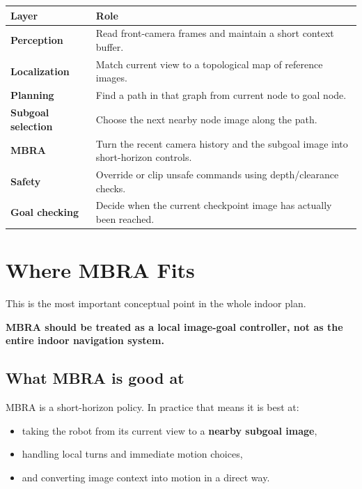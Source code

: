 \documentclass[11pt,a4paper]{article}
\begin{document}
\begin{longtable}{p{} p{}}
\toprule
\textbf{Layer} & \textbf{Role} \\
\midrule
\textbf{Perception} & Read front-camera frames and maintain a short context buffer. \\
\textbf{Localization} & Match current view to a topological map of reference images. \\
\textbf{Planning} & Find a path in that graph from current node to goal node. \\
\textbf{Subgoal selection} & Choose the next nearby node image along the path. \\
\textbf{MBRA} & Turn the recent camera history and the subgoal image into short-horizon controls. \\
\textbf{Safety} & Override or clip unsafe commands using depth/clearance checks. \\
\textbf{Goal checking} & Decide when the current checkpoint image has actually been reached. \\
\bottomrule
\end{longtable}


\section{Where MBRA Fits}

This is the most important conceptual point in the whole indoor plan.

\begin{mdframed}
\textbf{MBRA should be treated as a local image-goal controller, not as the
entire indoor navigation system.}
\end{mdframed}

\subsection{What MBRA is good at}

MBRA is a short-horizon policy. In practice that means it is best at:
\begin{itemize}[nosep]
  \item taking the robot from its current view to a \textbf{nearby subgoal image},
  \item handling local turns and immediate motion choices,
  \item and converting image context into motion in a direct way.
\end{itemize}
\end{document}
